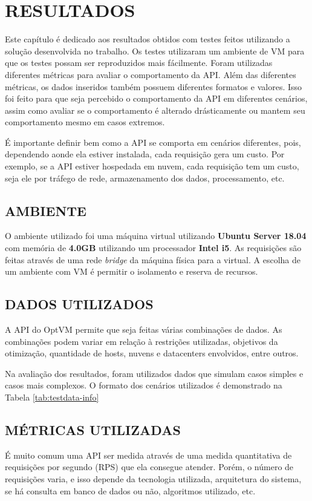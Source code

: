 \chapter{RESULTADOS}
\label{chap:results}

Este capítulo é dedicado aos resultados obtidos com testes
feitos utilizando a solução desenvolvida no trabalho. Os testes
utilizaram um ambiente de VM para que os testes possam ser reproduzidos 
mais fácilmente. Foram utilizadas diferentes métricas para avaliar
o comportamento da API. Além das diferentes métricas, os dados inseridos 
também possuem diferentes formatos e valores. Isso foi feito para que 
seja percebido o comportamento da API em diferentes cenários, assim como
avaliar se o comportamento é alterado drásticamente ou mantem seu comportamento
mesmo em casos extremos.

É importante definir bem como a API se comporta em cenários diferentes, pois,
dependendo aonde ela estiver instalada, cada requisição gera um custo. Por exemplo, se a API 
estiver hospedada em nuvem, cada requisição tem um custo, seja ele por tráfego de
rede, armazenamento dos dados, processamento, etc. 

\section{AMBIENTE}

O ambiente utilizado foi uma máquina virtual utilizando \textbf{Ubuntu Server 18.04}
com memória de \textbf{4.0GB} utilizando um processador \textbf{Intel i5}. As requisições
são feitas através de uma rede \textit{bridge} da máquina física para a virtual.
A escolha de um ambiente com VM é permitir o isolamento e reserva de recursos.

\section{DADOS UTILIZADOS}
A API do OptVM permite que seja feitas várias combinações de dados. As combinações
podem variar em relação à restrições utilizadas, objetivos da otimização, quantidade
de hosts, nuvens e datacenters envolvidos, entre outros. 

Na avaliação dos resultados, foram utilizados dados que simulam casos simples e casos mais 
complexos. O formato dos cenários utilizados é demonstrado na Tabela \ref{tab:testdata-info}



\section{MÉTRICAS UTILIZADAS}
É muito comum uma API ser medida através de uma medida quantitativa de requisições 
por segundo (RPS) que ela consegue atender. Porém, o número de requisições 
varia, e isso depende da tecnologia utilizada, arquitetura do sistema, se há 
consulta em banco de dados ou não, algoritmos utilizado, etc.

